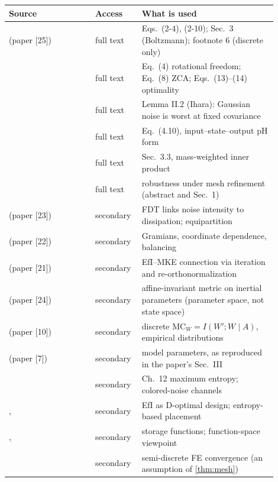 \documentclass[11pt]{article}
\theoremstyle{definition}
\theoremstyle{remark}
\begin{document}
\begin{center}\small
\begin{tabular}{>{\raggedright}p{0.30\linewidth}p{0.13\linewidth}>{\raggedright\arraybackslash}p{0.47\linewidth}}
\toprule
Source & Access & What is used \\
\midrule
\citet{jaynes1957information} (paper [25]) & full text & Eqs.\ (2-4), (2-10); Sec.~3 (Boltzmann); footnote 6 (discrete only)\\
\citet{kessy2018optimal} & full text & Eq.~(4) rotational freedom; Eq.~(8) ZCA; Eqs.~(13)--(14) optimality\\
\citet{diggavi2001worst} & full text & Lemma II.2 (Ihara): Gaussian noise is worst at fixed covariance\\
\citet{vanderschaft2014port} & full text & Eq.~(4.10), input--state--output pH form\\
\citet{buithanh2013computational} & full text & Sec.~3.3, mass-weighted inner product\\
\citet{cotter2013mcmc} & full text & robustness under mesh refinement (abstract and Sec.~1)\\
\citet{kubo1966fluctuation} (paper [23]) & secondary & FDT links noise intensity to dissipation; equipartition\\
\citet{moore1981principal} (paper [22]) & secondary & Gramians, coordinate dependence, balancing\\
\citet{li2007connection} (paper [21]) & secondary & EfI--MKE connection via iteration and re-orthonormalization\\
\citet{lee2020geometric} (paper [24]) & secondary & affine-invariant metric on inertial parameters (parameter space, not state space)\\
\citet{zahedi2013quantifying} (paper [10]) & secondary & discrete $\mathrm{MC}_W=I(W';W\mid A)$, empirical distributions\\
\citet{wensing2017proprioceptive} (paper [7]) & secondary & model parameters, as reproduced in the paper's Sec.~III\\
\citet{cover2006elements} & secondary & Ch.~12 maximum entropy; colored-noise channels\\
\citet{kammer1991sensor}, \citet{papadimitriou2004optimal} & secondary & EfI as D-optimal design; entropy-based placement\\
\citet{willems1972dissipative}, \citet{stuart2010inverse} & secondary & storage functions; function-space viewpoint\\
\citet{dupont1973l2,baker1976error,geveci1984convergence} & secondary & semi-discrete FE convergence (an assumption of \cref{thm:mesh})\\

\end{tabular}
\end{center}
\end{document}
